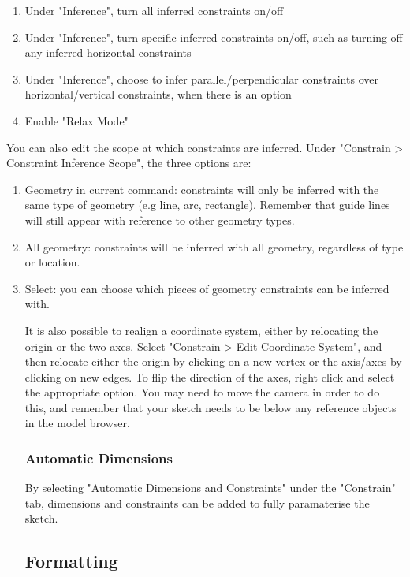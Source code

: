 \begin{enumerate}
    \item Under "Inference", turn all inferred constraints on/off
    \item Under "Inference", turn specific inferred constraints on/off, such as turning off any inferred horizontal constraints
    \item Under "Inference", choose to infer parallel/perpendicular constraints over horizontal/vertical constraints, when there is an option
    \item Enable "Relax Mode"
\end{enumerate}

You can also edit the scope at which constraints are inferred. Under "Constrain > Constraint Inference Scope", the three options are:

\begin{enumerate}
    \item Geometry in current command: constraints will only be inferred with the same type of geometry (e.g line, arc, rectangle). Remember that guide lines will still appear with reference to other geometry types.
    \item All geometry: constraints will be inferred with all geometry, regardless of type or location.
    \item Select: you can choose which pieces of geometry constraints can be inferred with.

It is also possible to realign a coordinate system, either by relocating the origin or the two axes. Select "Constrain > Edit Coordinate System", and then relocate either the origin by clicking on a new vertex or the axis/axes by clicking on new edges. To flip the direction of the axes, right click and select the appropriate option. You may need to move the camera in order to do this, and remember that your sketch needs to be below any reference objects in the model browser. 


\subsubsection{Automatic Dimensions}
By selecting "Automatic Dimensions and Constraints" under the "Constrain" tab, dimensions and constraints can be added to fully paramaterise the sketch.

\subsection{Formatting}


\end{enumerate}
